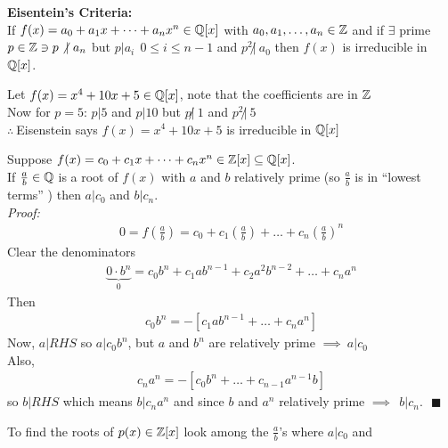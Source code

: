 \newpage
\begin{tcolorbox}
    \textbf{Eisentein's Criteria:} \\ \steezybreak
    If $f(x)=a_0+a_1x+ \dots + a_n x^n \in {\mathbb{Q}}[x]$ with $a_0, a_1, \dots, a_n \in {\mathbb{Z}}$ and if
    $\exists$ prime $p\in {\mathbb{Z}}\ni p \not | \ a_n$ but $p|a_i \ \ 0\leq i \leq n-1$ and
    $p^2 \not | \ a_0$ then $f(x)$ is irreducible in ${\mathbb{Q}}[x]$.
\end{tcolorbox}
\begin{example}
    Let $f(x)= x^4 + 10x + 5 \in {\mathbb{Q}}[x]$, note that the coefficients are in ${\mathbb{Z}}$ \\
    Now for $p=5$: $p|5$ and $p|10$ but $p\not | \ 1$ and $p^2 \not | \ 5$ \\
    $\therefore \ $Eisenstein says $f(x)=x^4+10x+5$ is irreducible in ${\mathbb{Q}}[x]$
\end{example}
\begin{lemma*}
    Suppose $f(x) = c_0 + c_1x + \dots + c_n x^n \in {\mathbb{Z}}[x] \subseteq {\mathbb{Q}}[x]$. \\
    If $\frac{a}{b} \in {\mathbb{Q}}$ is a root of $f(x)$ with $a$ and $b$ relatively prime (so $\frac{a}{b}$
    is in ``lowest terms'' ) then $a|c_0$ and $b|c_n$. \\

    \noindent \textit{Proof: }
    \begin{align*}
        0 = f\left(\frac{a}{b}\right)= c_0 + c_1\left(\frac{a}{b}\right) + \dots + c_n\left(\frac{a}{b}\right)^n
    \end{align*}
    Clear the denominators
    \begin{align*}
        \underbrace{0\cdot b^n}_{0} =  c_0b^n + c_1ab^{n-1} + c_2a^2b^{n-2} + \dots + c_na^n
    \end{align*}
    Then
    \begin{align*}
        c_0b^n = -[c_1ab^{n-1} + \dots + c_na^n]
    \end{align*}
    Now, $a|RHS$ so $a|c_0b^n$, but $a$ and $b^n$ are relatively prime $\implies \ a|c_0$ \\
    Also,
    \begin{align*}
        c_na^n = -[c_0b^n + \dots + c_{n-1}a^{n-1}b]
    \end{align*}
    so $b| RHS$ which means $b|c_na^n$ and since $b$ and $a^n$ relatively prime
    $\implies \ \ b|c_n. \ \ \ \blacksquare$
\end{lemma*}
To find the roots of $p(x) \in {\mathbb{Z}}[x]$ look among the $\frac{a}{b}$'s where $a|c_0$ and
